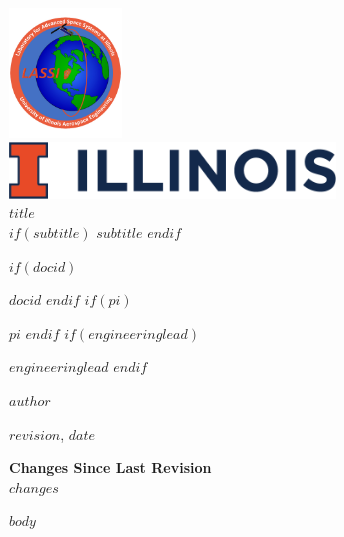 \documentclass[11pt, twoside]{article}
\title{}
\author{}
\begin{document}
\thispagestyle{empty}
\begin{center}
	\includegraphics[width=3cm]{lassi-logo.jpg}\\
	\includegraphics[height=1.5cm]{Illinois-Wordmark-Horizontal-Full-Color-RGB.png}\\
	\vspace{10mm}
	{\huge \textbf{$title$}}\\
	\vspace{2.5mm}
	$if(subtitle)$
	{\Large $subtitle$}
	$endif$
\end{center}
\vspace{12mm}
\large{
\begin{description}
	$if(docid)$
	\item [Document ID] $docid$
	$endif$
	$if(pi)$
	\item [Principal Investigator] $pi$
	$endif$
	$if(engineeringlead)$
	\item [Engineering Lead] $engineeringlead$
	$endif$
	\item [Document Maintainer] $author$
	\item [Revision] $revision$, $date$
\end{description}
\textbf{Changes Since Last Revision}\\
$changes$
}
\newpage
$body$
\end{document}
